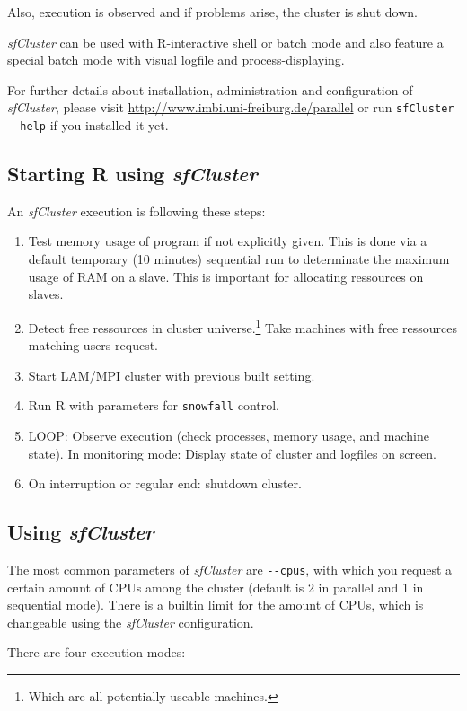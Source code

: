 \documentclass[10pt,oneside]{article}
\begin{document}
Also, execution is observed and if problems arise, the cluster is shut down.

\emph{sfCluster} can be used with R-interactive shell or batch mode and also feature
a special batch mode with visual logfile and process-displaying.

For further details about installation, administration and configuration of
\emph{sfCluster}, please visit \url{http://www.imbi.uni-freiburg.de/parallel} or
run \texttt{sfCluster {-}{-}help} if you installed it yet.

\subsection{Starting R using \emph{sfCluster}}
An \emph{sfCluster} execution is following these steps:

\begin{enumerate}
 \item Test memory usage of program if not explicitly given. This is done via
       a default temporary (10 minutes) sequential run to determinate the maximum usage
       of RAM on a slave.
       This is important for allocating ressources on slaves.
 \item Detect free ressources in cluster universe.\footnote{Which are all potentially
       useable machines.} Take machines with free ressources matching users
       request.
 \item Start LAM/MPI cluster with previous built setting.
 \item Run R with parameters for \texttt{snowfall} control.
 \item LOOP: Observe execution (check processes, memory usage, and machine state). In
       monitoring mode: Display state of cluster and logfiles on screen.
 \item On interruption or regular end: shutdown cluster.
\end{enumerate}

\subsection{Using \emph{sfCluster}}
The most common parameters of \emph{sfCluster} are \texttt{{-}{-}cpus}, with which you request a certain
amount of CPUs among the cluster (default is 2 in parallel and 1 in sequential mode).
There is a builtin limit for the amount of CPUs, which is changeable using the
\emph{sfCluster} configuration.

There are four execution modes:
\end{document}
